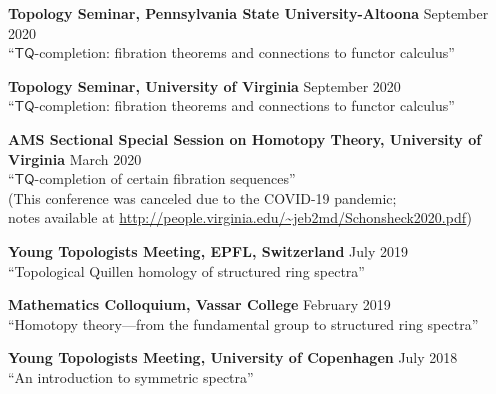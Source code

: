 \documentclass[10pt,letterpaper]{article}
\renewenvironment{itemize}{
  \begin{list}{}{
    \setlength{\leftmargin}{1.5em}
    \setlength{\itemsep}{0.25em}
    \setlength{\parskip}{0pt}
    \setlength{\parsep}{0.25em}
  }
}{
  \end{list}
}
\begin{document}
\begin{itemize}
\item{\bf Topology Seminar, Pennsylvania State University-Altoona} \hfill September 2020\\
``$\mathsf{TQ}$-completion: fibration theorems and connections to functor calculus''


\item{\bf Topology Seminar, University of Virginia} \hfill September 2020\\
``$\mathsf{TQ}$-completion: fibration theorems and connections to functor calculus''
	
	
\item {\bf AMS Sectional Special Session on Homotopy Theory, University of Virginia} \hfill March 2020\\
``$\mathsf{TQ}$-completion of certain fibration sequences''\\
(This conference was canceled due to the COVID-19 pandemic; \\notes available at \url{http://people.virginia.edu/~jeb2md/Schonsheck2020.pdf})

\item {\bf Young Topologists Meeting, EPFL, Switzerland} \hfill July 2019 \\
``Topological Quillen homology of structured ring spectra''
 
 
\item {\bf Mathematics Colloquium, Vassar College} \hfill February 2019 \\
``Homotopy theory---from the fundamental group to structured ring spectra''

  \item {\bf Young Topologists Meeting, University of Copenhagen} \hfill July 2018 \\
 ``An introduction to symmetric spectra''

\end{itemize}
\end{document}
